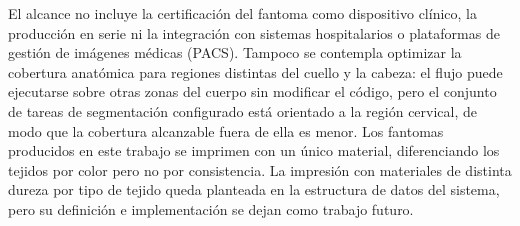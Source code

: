 El alcance no incluye la certificación del fantoma como dispositivo clínico, la producción en serie ni la integración con sistemas hospitalarios o plataformas de gestión de imágenes médicas (PACS). Tampoco se contempla optimizar la cobertura anatómica para regiones distintas del cuello y la cabeza: el flujo puede ejecutarse sobre otras zonas del cuerpo sin modificar el código, pero el conjunto de tareas de segmentación configurado está orientado a la región cervical, de modo que la cobertura alcanzable fuera de ella es menor. Los fantomas producidos en este trabajo se imprimen con un único material, diferenciando los tejidos por color pero no por consistencia. La impresión con materiales de distinta dureza por tipo de tejido queda planteada en la estructura de datos del sistema, pero su definición e implementación se dejan como trabajo futuro.